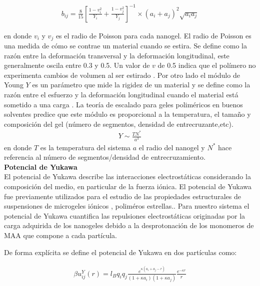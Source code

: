 	\begin{align}
		b_{ij} = \frac{8}{15}\left[\frac{1-v_i^2}{Y_i} + \frac{1-v_j^2}{Y_j}  \right]^{-1} \times(a_i +a_j)^2 \sqrt{a_ia_j}
		\label{eq:mc:bij_param}
	\end{align}
	
	\noindent en donde $v_i$ y $v_j$ es el radio de Poisson para cada nanogel.
	El radio de Poisson es una medida de c\'omo se contrae un material cuando se estira. Se define como la raz\'on entre la deformación transversal y la deformación longitudinal, este generalmente oscila entre 0.3 y 0.5. Un valor de $v$ de 0.5 indica que el pol\'imero no experimenta cambios de volumen al ser estirado \cite{bertoldi2010negative}.
	Por otro lado el m\'odulo de  Young $Y$  es un par\'ametro  que mide la rigidez de un material y se define como la raz\'on entre el esfuerzo y la deformaci\'on longitudinal cuando el material est\'a sometido a una carga \cite{ku2011review}.
	La teor\'ia de escalado para geles polim\'ericos en buenos solventes \cite{de1979scaling,hu2012polymer} predice que este m\'odulo es proporcional a la temperatura, el tamaño y composici\'on del gel (n\'umero de segmentos, densidad de entrecruzante,etc).
	\begin{align}
		Y \sim \frac{TN^*}{a^3}
	\end{align}
	\noindent en donde $T$ es la temperatura del sistema $a$ el radio del nanogel y $N^*$ hace referencia al n\'umero de segmentos/densidad de entrecruzamiento. \\
	
	
	\textbf{Potencial de Yukawa} \\
	
	El potencial de Yukawa describe las interacciones electrost\'aticas considerando la composici\'on del medio, en particular de la fuerza i\'onica.
	El potencial de Yukawa fue previamente utilizados para el estudio de las propiedades estructurales de suspensiones de microgeles i\'onicos \citet{weyer2018concentration}, polim\'eros estrellas.\cite{denton2003counterion}. Para nuestro sistema el potencial de Yukawa cuantifica las repulsiones electrost\'aticas originadas por la carga adquirida de los nanogeles debido a la desprotonaci\'on  de los monomeros de MAA que compone a cada part\'icula.

	
	De forma expl\'icita se define el potencial de Yukawa en dos part\'iculas como: 
	
	\begin{align}
		\beta u^Y_{ij}(r) = l_Bq_i q_j \frac{e^{\kappa(a_i + a_j -r)}}{(1 +\kappa a_i)(1 + \kappa a_j)} \frac{e^{-\kappa r}}{r} 
		\label{eq:mc:yukawa}
	\end{align}
	
